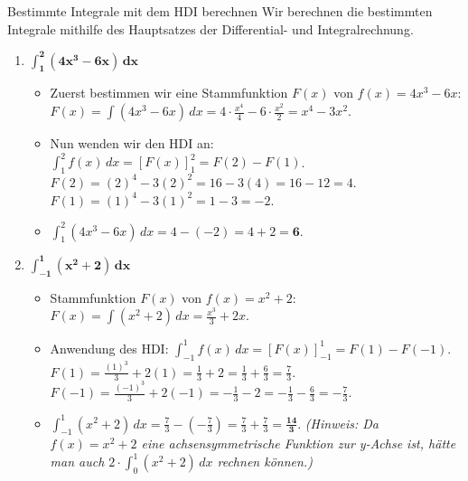 \begin{loesungsumgebung}{Bestimmte Integrale mit dem HDI berechnen}
Wir berechnen die bestimmten Integrale mithilfe des Hauptsatzes der Differential- und Integralrechnung.

\begin{enumerate}[label=(\alph*)]
    \item $\mathbf{\int_{1}^{2} (4x^3 - 6x) \,dx}$
    \begin{itemize}
        \item Zuerst bestimmen wir eine Stammfunktion $F(x)$ von $f(x) = 4x^3 - 6x$:
        $F(x) = \int (4x^3 - 6x) \,dx = 4 \cdot \frac{x^4}{4} - 6 \cdot \frac{x^2}{2} = x^4 - 3x^2$.
        \item Nun wenden wir den HDI an: $\int_{1}^{2} f(x) \,dx = [F(x)]_{1}^{2} = F(2) - F(1)$.
        $F(2) = (2)^4 - 3(2)^2 = 16 - 3(4) = 16 - 12 = 4$.
        $F(1) = (1)^4 - 3(1)^2 = 1 - 3 = -2$.
        \item $\int_{1}^{2} (4x^3 - 6x) \,dx = 4 - (-2) = 4 + 2 = \mathbf{6}$.
    \end{itemize}

    \item $\mathbf{\int_{-1}^{1} (x^2 + 2) \,dx}$
    \begin{itemize}
        \item Stammfunktion $F(x)$ von $f(x) = x^2 + 2$:
        $F(x) = \int (x^2 + 2) \,dx = \frac{x^3}{3} + 2x$.
        \item Anwendung des HDI: $\int_{-1}^{1} f(x) \,dx = [F(x)]_{-1}^{1} = F(1) - F(-1)$.
        $F(1) = \frac{(1)^3}{3} + 2(1) = \frac{1}{3} + 2 = \frac{1}{3} + \frac{6}{3} = \frac{7}{3}$.
        $F(-1) = \frac{(-1)^3}{3} + 2(-1) = -\frac{1}{3} - 2 = -\frac{1}{3} - \frac{6}{3} = -\frac{7}{3}$.
        \item $\int_{-1}^{1} (x^2 + 2) \,dx = \frac{7}{3} - (-\frac{7}{3}) = \frac{7}{3} + \frac{7}{3} = \mathbf{\frac{14}{3}}$.
        \textit{(Hinweis: Da $f(x)=x^2+2$ eine achsensymmetrische Funktion zur y-Achse ist, hätte man auch $2 \cdot \int_{0}^{1} (x^2+2) \,dx$ rechnen können.)}
    \end{itemize}


\end{enumerate}
\end{loesungsumgebung}
